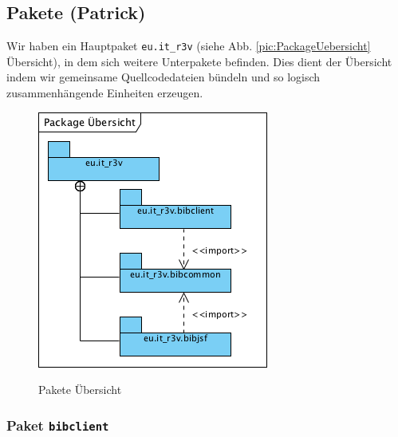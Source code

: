 \documentclass[fontsize=12pt,paper=a4,twoside]{scrartcl}
\begin{document}
\subsection{Pakete (Patrick)}
\label{sec:pakete}

Wir haben ein Hauptpaket \texttt{eu.it\_r3v} (siehe Abb. \vref{pic:PackageUebersicht} Übersicht), in dem sich weitere Unterpakete befinden. Dies dient der Übersicht indem wir gemeinsame Quellcodedateien bündeln und so logisch zusammenhängende Einheiten erzeugen.

\begin{figure} [H] 
\caption{Pakete Übersicht} \centering
	\includegraphics[scale=1.55]{Diagramme/PackageUebersicht.png} 
	\label{pic:PackageUebersicht} 
\end{figure}
\label{sec:PackageUebersicht}

\subsubsection{Paket \texttt{bibclient}}
\label{sec:bibclient}
\end{document}
